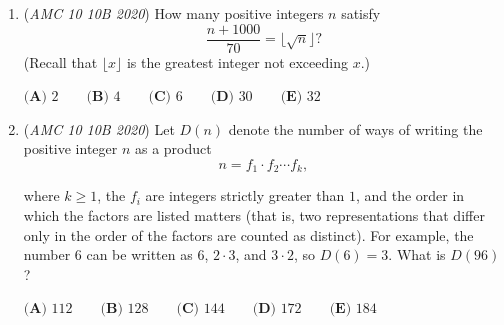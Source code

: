 \begin{enumerate}
 $\quad\bullet\qquad$ $R,$ a rotation of $90^{\circ}$ clockwise around the origin;


 $\quad\bullet\qquad$ $H,$ a reflection across the $x$-axis; and


 $\quad\bullet\qquad$ $V,$ a reflection across the $y$-axis.


 Each of these transformations maps the squares onto itself, but the positions of the labeled vertices will change. For example, applying $R$ and then $V$ would send the vertex $A$ at $(1,1)$ to $(-1,-1)$ and would send the vertex $B$ at $(-1,1)$ to itself. How many sequences of $20$ transformations chosen from $\{L, R, H, V\}$ will send all of the labeled vertices back to their original positions? (For example, $R, R, V, H$ is one sequence of $4$ transformations that will send the vertices back to their original positions.)


 $\textbf{(A)}\ 2^{37} \qquad\textbf{(B)}\ 3\cdot 2^{36} \qquad\textbf{(C)}\  2^{38} \qquad\textbf{(D)}\ 3\cdot 2^{37} \qquad\textbf{(E)}\ 2^{39}$


	\item (\textit{AMC 10 10B 2020}) How many positive integers $n$ satisfy
 \[\dfrac{n+1000}{70} = \lfloor \sqrt{n} \rfloor?\](Recall that $\lfloor x\rfloor$ is the greatest integer not exceeding $x$.)


 $\textbf{(A) } 2 \qquad\textbf{(B) } 4 \qquad\textbf{(C) } 6 \qquad\textbf{(D) } 30 \qquad\textbf{(E) } 32$


	\item (\textit{AMC 10 10B 2020}) Let $D(n)$ denote the number of ways of writing the positive integer $n$ as a product
 \[n = f_1\cdot f_2\cdots f_k,\]


 where $k\ge1$, the $f_i$ are integers strictly greater than $1$, and the order in which the factors are listed matters (that is, two representations that differ only in the order of the factors are counted as distinct). For example, the number $6$ can be written as $6$, $2\cdot 3$, and $3\cdot2$, so $D(6) = 3$. What is $D(96)$?


 $\textbf{(A) } 112 \qquad\textbf{(B) } 128 \qquad\textbf{(C) } 144 \qquad\textbf{(D) } 172 \qquad\textbf{(E) } 184$


\end{enumerate}